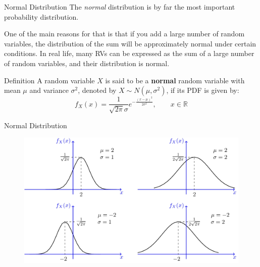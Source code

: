 \documentclass{beamer}
\newcommand{\R}{\mathbb{R}}
\newcommand{\E}{\mathbb{E}}
\newcommand{\Var}{\text{Var}}
\begin{document}
	
	
	
	\begin{frame}{Normal Distribution}
		The \textit{normal} distribution is by far the most important probability distribution. \pause
		
		One of the main reasons for that is that if you add a large number of random variables, the distribution of the sum will be approximately normal under certain conditions. In real life, many RVs can be expressed as the sum of a large number of random variables, and their distribution is normal. 
		
		\pause
		
		\begin{block}{Definition}
		A random variable $X$ is said to be a \textbf{normal} random variable with mean $\mu$ and variance $\sigma^2$, denoted by $X\sim N(\mu, \sigma^2)$, if its PDF is given by:
		\begin{equation}
			\nonumber f_X(x) = \frac{1}{ \sqrt{2 \pi}\sigma} e^{-\frac{(x-\mu)^2}{2\sigma^2}},\qquad x\in\R
		\end{equation}
	\end{block}
	\end{frame}
	\begin{frame}{Normal Distribution}
\begin{figure}
	\centering
	\includegraphics[width=1\linewidth]{0.42}
	\label{fig:0}
\end{figure}

	
	\end{frame}
	
	
	
\end{document}
